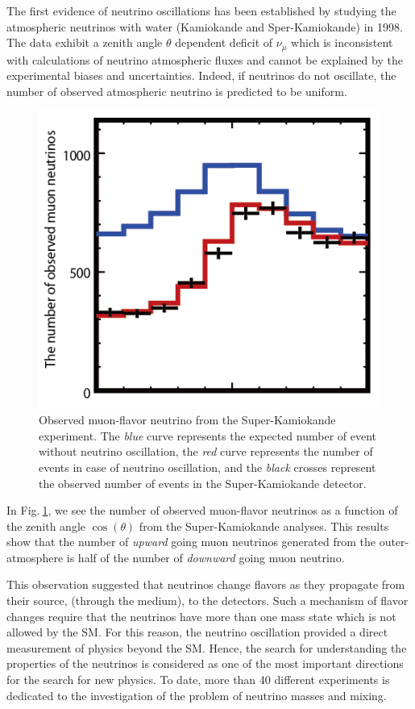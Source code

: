 \documentclass[twocolumn,secnumarabic,amssymb, nobibnotes, aps, prd,10pt]{revtex4-1}
\newcommand{\Fig}[1]{Fig.$\:$\ref{#1}}
\begin{document}
The first evidence of neutrino oscillations has been established by studying the 
atmospheric neutrinos with water \cite{Fukuda:1998mi, Ashie:2004mr} (Kamiokande and 
Sper-Kamiokande) in 1998. The data exhibit a zenith angle $\theta$ dependent deficit of 
$\nu_\mu$ which is inconsistent with calculations of neutrino atmospheric fluxes and 
cannot be explained by the experimental biases and uncertainties. Indeed, if neutrinos
do not oscillate, the number of observed atmospheric neutrino is predicted to be
uniform.
\begin{figure}
\centering
\includegraphics[scale=0.425]{zenith.png}
\caption{Observed muon-flavor neutrino from the Super-Kamiokande experiment. The \emph{blue}
curve represents the expected number of event without neutrino oscillation, the \emph{red}
curve represents the number of events in case of neutrino oscillation, and the \emph{black}
crosses represent the observed number of events in the Super-Kamiokande detector.}
\label{fig:superKami}
\end{figure}
In \Fig{fig:superKami}, we see the number of observed muon-flavor neutrinos as a function of
the zenith angle $\cos (\theta)$ from the Super-Kamiokande analyses. This results show that
the number of \emph{upward} going muon neutrinos generated from the outer-atmosphere is half 
of the number of \emph{downward} going muon neutrino.

This observation suggested that neutrinos change flavors as they propagate from their source,
(through the medium), to the detectors. Such a mechanism of flavor changes require that the
neutrinos have more than one mass state which is not allowed by the SM. For this reason, the
neutrino oscillation provided a direct measurement of physics beyond the SM. Hence, the search
for understanding the properties of the neutrinos is considered as one of the most important
directions for the search for new physics. To date, more than 40 different experiments is
dedicated to the investigation of the problem of neutrino masses and mixing.
\end{document}
